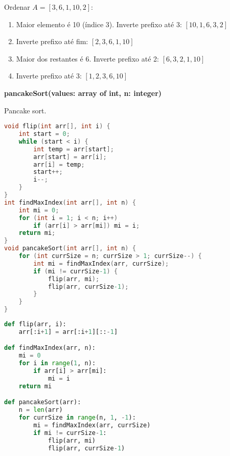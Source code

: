 \begin{exmp}
Ordenar $A = [3, 6, 1, 10, 2]$:

\begin{enumerate}
    \item Maior elemento é 10 (índice 3). Inverte prefixo até 3: $[10, 1, 6, 3, 2]$
    \item Inverte prefixo até fim: $[2, 3, 6, 1, 10]$
    \item Maior dos restantes é 6. Inverte prefixo até 2: $[6, 3, 2, 1, 10]$
    \item Inverte prefixo até 3: $[1, 2, 3, 6, 10]$
\end{enumerate}
\end{exmp}

\begin{center}
\begin{minipage}{.9\linewidth}
\begin{algorithm}[H]
\DontPrintSemicolon
\textbf{pancakeSort(values: array of int, n: integer)}

\caption{Pancake sort.}
\label{lab:alg-pancakeSort}
\end{algorithm}
\end{minipage}
\end{center}

\begin{lstlisting}[language=C,caption={Pancake sort em C},captionpos=t]
void flip(int arr[], int i) {
    int start = 0;
    while (start < i) {
        int temp = arr[start];
        arr[start] = arr[i];
        arr[i] = temp;
        start++;
        i--;
    }
}
int findMaxIndex(int arr[], int n) {
    int mi = 0;
    for (int i = 1; i < n; i++)
        if (arr[i] > arr[mi]) mi = i;
    return mi;
}
void pancakeSort(int arr[], int n) {
    for (int currSize = n; currSize > 1; currSize--) {
        int mi = findMaxIndex(arr, currSize);
        if (mi != currSize-1) {
            flip(arr, mi);
            flip(arr, currSize-1);
        }
    }
}
\end{lstlisting}

\begin{lstlisting}[language=python,caption={Pancake sort em Python},captionpos=t]
def flip(arr, i):
    arr[:i+1] = arr[:i+1][::-1]

def findMaxIndex(arr, n):
    mi = 0
    for i in range(1, n):
        if arr[i] > arr[mi]:
            mi = i
    return mi

def pancakeSort(arr):
    n = len(arr)
    for currSize in range(n, 1, -1):
        mi = findMaxIndex(arr, currSize)
        if mi != currSize-1:
            flip(arr, mi)
            flip(arr, currSize-1)
\end{lstlisting}

